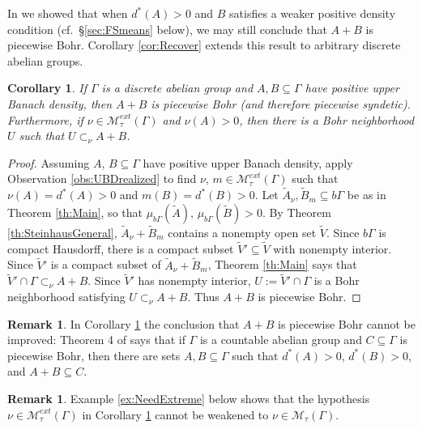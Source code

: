 \documentclass[12pt]{amsart} \usepackage{amsmath,centernot,amssymb,leftindex}
\newtheorem{corollary}[theorem]{Corollary}
\numberwithin{theorem}{section}
\numberwithin{equation}{section}
\theoremstyle{definition}
\newtheorem{remark}[theorem]{Remark}
\begin{document}
	In \cite[Theorem 1.4]{Griesmer_SumsetsDenseSparse} we showed that when $d^{*}(A)>0$ and $B$ satisfies a weaker positive density condition (cf.~\S\ref{sec:FSmeans} below), we may still conclude that $A+B$ is piecewise Bohr.  Corollary \ref{cor:Recover} extends this result to arbitrary discrete abelian groups. 
	 
	\begin{corollary}\label{cor:PWB}
		If $\Gamma$ is a discrete abelian group and $A, B\subseteq \Gamma$ have positive upper Banach density, then $A+B$ is piecewise Bohr (and therefore piecewise syndetic).  Furthermore, if $\nu\in \mathcal M_{\tau}^{ext}(\Gamma)$ and $\nu(A)>0$, then there is a Bohr neighborhood $U$ such that $U\subset_{\nu} A+B$.
	\end{corollary}

\begin{proof}
	Assuming $A$, $B\subseteq \Gamma$ have positive upper Banach density, apply Observation \ref{obs:UBDrealized} to find $\nu$, $m\in \mathcal M_{\tau}^{ext}(\Gamma)$ such that $\nu(A)=d^{*}(A)>0$ and $m(B)=d^{*}(B)>0$.  Let $\tilde{A}_{\nu}, \tilde{B}_{m}\subseteq b\Gamma$ be as in Theorem \ref{th:Main}, so that $\mu_{b\Gamma}(\tilde{A})$, $\mu_{b\Gamma}(\tilde{B})>0$.  By Theorem \ref{th:SteinhausGeneral}, $\tilde{A}_{\nu}+\tilde{B}_{m}$ contains a nonempty open set $\tilde{V}$.  Since $b\Gamma$ is compact Hausdorff, there is a compact subset $\tilde{V}'\subseteq \tilde{V}$ with nonempty interior.  Since $\tilde{V}'$ is a compact subset of $\tilde{A}_{\nu}+\tilde{B}_{m}$, Theorem \ref{th:Main} says that $\tilde{V}'\cap \Gamma \subset_{\nu} A+B$.   Since $\tilde{V}'$ has nonempty interior, $U:=\tilde{V}'\cap \Gamma$ is a Bohr neighborhood satisfying $U\subset_{\nu}A+B$.  Thus $A+B$ is piecewise Bohr.
\end{proof}

	
\begin{remark}	In Corollary \ref{cor:PWB} the conclusion that $A+B$ is piecewise Bohr cannot be improved: Theorem 4 of \cite{BeiglbockBergelsonFish} says that if $\Gamma$ is a countable abelian group and $C\subseteq \Gamma$ is piecewise Bohr, then there are sets $A, B\subseteq \Gamma$ such that $d^*(A)>0$, $d^*(B)>0$, and $A+B\subseteq C$. 
\end{remark}

\begin{remark}
	Example \ref{ex:NeedExtreme} below shows  that the hypothesis $\nu\in \mathcal M_{\tau}^{ext}(\Gamma)$ in  Corollary \ref{cor:PWB} cannot be weakened to $\nu \in \mathcal M_{\tau}(\Gamma)$.
\end{remark}
\end{document}
